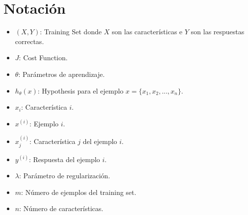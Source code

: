 \section{Notación}

\begin{itemize}
\item $(X,Y)$: Training Set donde $X$ son las características e $Y$ son las respuestas correctas.
\item $J$: Cost Function.
\item $\theta$: Parámetros de aprendizaje.
\item $h_{\theta}(x)$: Hypothesis para el ejemplo $x=\{ x_1, x_2, ..., x_n\}$.
\item $x_i$: Característica $i$.
\item $x^{(i)}$: Ejemplo $i$.
\item $x_{j}^{(i)}$: Característica $j$ del ejemplo $i$.
\item $y^{(i)}$: Respuesta del ejemplo $i$.
\item $\lambda$: Parámetro de regularización.
\item $m$: Número de ejemplos del training set.
\item $n$: Número de características.
\end{itemize}